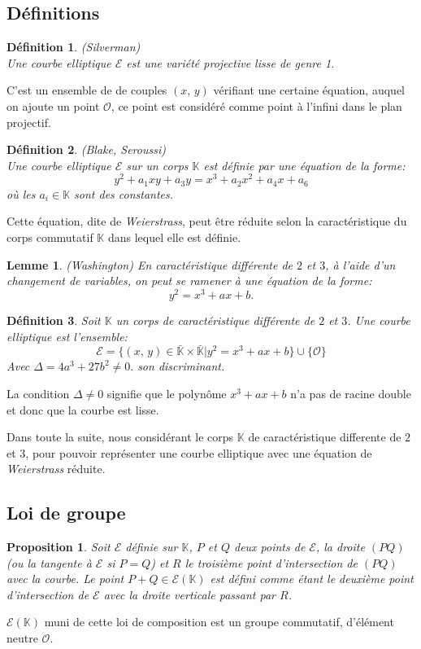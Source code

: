 \documentclass[letterpaper, 12pt]{article}
\newtheorem{lem}{Lemme}
\newtheorem{prop}{Proposition}
\newtheorem{defi}{Définition}
\begin{document}
\subsection{Définitions}
\begin{defi}(Silverman)\\
	Une courbe elliptique $\mathcal{E}$ est une variété projective lisse de genre 1.
\end{defi}
C'est un ensemble de de couples $(x,\,y)$ vérifiant une certaine équation, auquel on ajoute un point $\mathcal{O}$, ce point est considéré comme point à l'infini dans le plan projectif.
\begin{defi}(Blake, Seroussi)\\
	Une courbe elliptique $\mathcal{E}$ sur un corps $\mathbb{K}$ est définie par une équation de la forme: $$y^2+ a_1xy+a_3y = x^3+a_2x^2+a_4x+a_6$$ où les $a_i \in \mathbb{K}$ sont des constantes.
\end{defi}
Cette équation, dite de \textit{Weierstrass}, peut être réduite selon la caractéristique du corps commutatif $\mathbb{K}$ dans lequel elle est définie.

\begin{lem}(Washington)
	En caractéristique différente de $2$ et $3$, à l'aide d'un changement de variables, on peut se ramener à une équation de la forme:
	$$y^2=x^3+ax+b.$$
\end{lem}

\begin{defi}
	Soit $\mathbb{K}$ un corps de caractéristique différente de $2$ et $3$.
	Une courbe elliptique est l'ensemble:
	$$\mathcal{E} =
	\{(x,\,y)\in \mathbb{\bar K}\times\mathbb{\bar K}
	|y^2 = x^3+ax+b\}\cup\{\mathcal{O}\}$$
	Avec $\Delta=4a^3+27b^2 \neq 0.$ son discriminant.
\end{defi}
La condition $\Delta \neq 0$ signifie que le polynôme $x^3+ax+b$ n'a pas de racine double et donc que la courbe est lisse.

Dans toute la suite, nous considérant le corps $\mathbb{K}$ de caractéristique differente de $2$ et $3$, pour pouvoir représenter une courbe elliptique avec une équation de \textit{Weierstrass} réduite.
\subsection{Loi de groupe}
\begin{prop}
	Soit $\mathcal{E}$ définie sur $\mathbb{K}$, $P$ et $Q$ deux points de $\mathcal{E}$, la droite $(PQ)$(ou la tangente à $\mathcal{E}$ si $P=Q$) et $R$ le troisième point d'intersection de $(PQ)$ avec la courbe.
	Le point $P+Q \in \mathcal{E(\mathbb{K})}$ est défini comme étant le deuxième point d'intersection de $\mathcal{E}$ avec la droite verticale passant par $R$.\\
\end{prop}
$\mathcal{E(\mathbb{K})}$ muni de cette loi de composition est un groupe commutatif, d'élément neutre $\mathcal{O}$.\\
\end{document}

